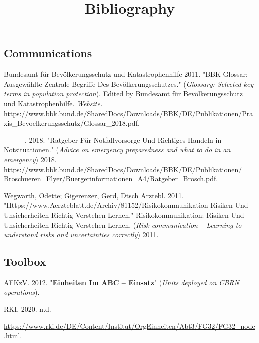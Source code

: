 \documentclass{article}
\begin{document}
\title{Bibliography}

\maketitle


\subsection{Communications}\label{H8291970}



Bundesamt für Bevölkerungsschutz und Katastrophenhilfe 2011. "BBK-Glossar: Ausgewählte Zentrale Begriffe Des Bevölkerungsschutzes." (\emph{Glossary: Selected key terms in population protection}). Edited by Bundesamt für Bevölkerungsschutz und Katastrophenhilfe. \emph{Website. }https://www.bbk.bund.de/SharedDocs/Downloads/BBK/DE/Publikationen/Praxis\_Bevoelkerungsschutz/Glossar\_2018.pdf.


———. 2018. "Ratgeber Für Notfallvorsorge Und Richtiges Handeln in Notsituationen." (\emph{Advice on emergency preparedness and what to do in an emergency}) 2018. https://www.bbk.bund.de/SharedDocs/Downloads/BBK/DE/Publikationen/ Broschueren\_Flyer/Buergerinformationen\_A4/Ratgeber\_Brosch.pdf.


Wegwarth, Odette; Gigerenzer, Gerd, Dtsch Arztebl. 2011. "Https://www.Aerzteblatt.de/Archiv/81152/Risikokommunikation-Risiken-Und-Unsicherheiten-Richtig-Verstehen-Lernen." Risikokommunikation: Risiken Und Unsicherheiten Richtig Verstehen Lernen, (\emph{Risk communication – Learning to understand risks and uncertainties correctly}) 2011.


\subsection{Toolbox}\label{H6136407}



AFKzV. 2012. "\textbf{Einheiten Im ABC – Einsatz}" (\emph{Units deployed on CBRN operations}).


RKI, 2020. n.d.


\href{https://www.rki.de/DE/Content/Institut/OrgEinheiten/Abt3/FG32/FG32_node.html}{https://www.rki.de/DE/Content/Institut/OrgEinheiten/Abt3/FG32/FG32\_node.html}.
\end{document}
